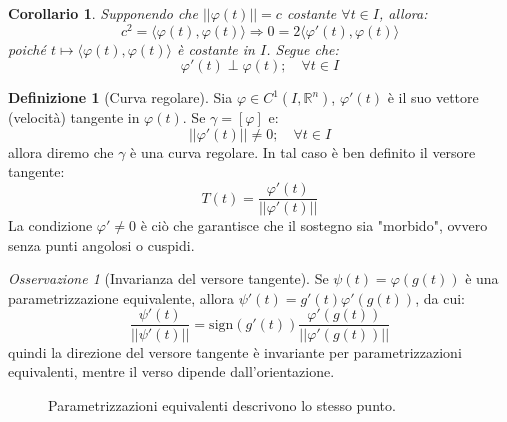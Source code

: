 \documentclass[11pt, a4paper, openright]{book}
\theoremstyle{plain}
\newtheorem{corollario}[teorema]{Corollario}
\theoremstyle{definition}
\newtheorem{definizione}[teorema]{Definizione}
\theoremstyle{remark}
\newtheorem{osservazione}[teorema]{Osservazione}
\newcommand{\innerprod}[2]{\langle #1, #2 \rangle}
\begin{document}
\begin{corollario}
    Supponendo che $||\varphi(t)|| = c$ costante $\forall t \in I$, allora:
    \begin{equation}
        c^2 = \innerprod{\varphi(t)}{\varphi(t)} \Longrightarrow 0 = 2\innerprod{\varphi'(t)}{\varphi(t)}
    \end{equation}
    poiché $t \longmapsto \innerprod{\varphi(t)}{\varphi(t)}$ è costante in $I$. Segue che:
    \begin{equation}
        \varphi'(t) \perp \varphi(t); \quad \forall t \in I
    \end{equation}
\end{corollario}

\begin{definizione}[Curva regolare]
    Sia $\varphi \in C^1(I, \mathbb{R}^n)$, $\varphi'(t)$ è il suo vettore (velocità) tangente in $\varphi(t)$. Se $\gamma = [\varphi]$ e:
    \begin{equation}
        ||\varphi'(t)|| \neq 0; \quad \forall t \in I
    \end{equation}
    allora diremo che $\gamma$ è una curva regolare. In tal caso è ben definito il versore tangente:
    \begin{equation}
        T(t) = \frac{\varphi'(t)}{||\varphi'(t)||}
    \end{equation}
    La condizione $\varphi' \neq 0$ è ciò che garantisce che il sostegno sia "morbido", ovvero senza punti angolosi o cuspidi.
\end{definizione}

\begin{osservazione}[Invarianza del versore tangente]
    Se $\psi(t) = \varphi(g(t))$ è una parametrizzazione equivalente, allora $\psi'(t) = g'(t)\varphi'(g(t))$, da cui:
    \begin{equation}
        \frac{\psi'(t)}{||\psi'(t)||} = \text{sign}(g'(t))\frac{\varphi'(g(t))}{||\varphi'(g(t))||}
    \end{equation}
    quindi la direzione del versore tangente è invariante per parametrizzazioni equivalenti, mentre il verso dipende dall'orientazione.
\begin{figure}[H]
    \centering
    \caption{Parametrizzazioni equivalenti descrivono lo stesso punto.}
\end{figure}
\end{osservazione}
\end{document}
